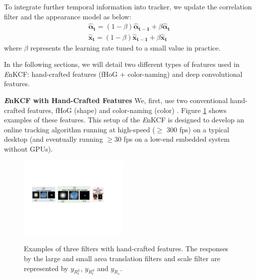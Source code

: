 \documentclass[10pt,twocolumn,letterpaper]{article}
\begin{document}
To integrate further temporal information into tracker, we update the
correlation filter and the appearance model as below:
\begin{align}
\boldsymbol{\hat{\alpha}_{t}} = (1-\beta) \boldsymbol{\hat{\alpha}_{t-1}} + \beta \boldsymbol{\hat{\alpha}_{t}} \\
\boldsymbol{\hat{x}_{t}} = (1-\beta) \boldsymbol{\hat{x}_{t-1}} + \beta \boldsymbol{\hat{x}_{t}}
\end{align}
where $\beta$ represents the learning rate tuned to a small value in practice.

In the following sections, we will detail two different types of
features used in {\it E}nKCF: hand-crafted features (fHoG +
color-naming) and deep convolutional features.

\textbf{{\it E}nKCF with Hand-Crafted Features} We, first, use two
conventional hand-crafted features, fHoG (shape)
\cite{felzenszwalb2010object} and color-naming (color)
\cite{li2014scale}. Figure \ref{fig:Filters} shows examples of these
features. This setup of the {\it E}nKCF is designed to develop an
online tracking algorithm running at high-speed ($\ge$ 300 fps) on a
typical desktop (and eventually running $\ge 30$ fps on a low-end
embedded system without GPUs).
\begin{figure}[!h]
\centering
\includegraphics[width=0.47\textwidth]{./figures/Filters_Details.pdf}
   \\[-3ex]
\label{fig:Rt_S}
\quad{}\label{fig:Rt_L}
\quad\quad{}\label{fig:Rs}
\caption{Examples of three filters with hand-crafted features. The
  responses by the large and small area translation filters and scale
  filter are represented by $y_{R_{t}^{L}}$, $y_{R_{t}^{S}}$ and
  $y_{R_{s}}$.}
\label{fig:Filters}
\end{figure}
\end{document}
